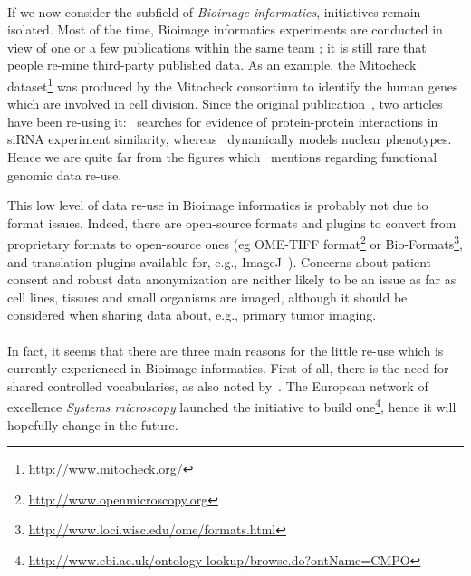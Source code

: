 \documentclass[12pt]{article}
\begin{document}
\paragraph*{}
If we now consider the subfield of \textit{Bioimage informatics}, initiatives remain isolated. Most of the time, Bioimage informatics experiments are conducted in view of one or a few publications within the same team ; it is still rare that people re-mine third-party published data. As an example, the Mitocheck dataset\footnote{\href{http://www.mitocheck.org/}{http://www.mitocheck.org/}} was produced by the Mitocheck consortium to identify the human genes which are involved in cell division. Since the original publication~\cite{pmid20360735}, two articles have been re-using it:~\cite{pmid25255318} searches for evidence of protein-protein interactions in siRNA experiment similarity, whereas~\cite{pmid24131777} dynamically models nuclear phenotypes. Hence we are quite far from the figures which~\cite{pmid24109559} mentions regarding functional genomic data re-use. 

This low level of data re-use in Bioimage informatics is probably not due to format issues. Indeed, there are open-source formats and plugins to convert from proprietary formats to open-source ones (eg OME-TIFF format\footnote{\href{http://www.openmicroscopy.org}{http://www.openmicroscopy.org}} or Bio-Formats\footnote{\href{http://www.loci.wisc.edu/ome/formats.html}{http://www.loci.wisc.edu/ome/formats.html}}, and translation plugins available for, e.g., ImageJ~\cite{imagej}). Concerns about patient consent and robust data anonymization are neither likely to be an issue as far as cell lines, tissues and small organisms are imaged, although it should be considered when sharing data about, e.g., primary tumor imaging.
\paragraph*{}
In fact, it seems that there are three main reasons for the little re-use which is currently experienced in Bioimage informatics. First of all, there is the need for shared controlled vocabularies, as also noted by~\cite{pmid18603566}. The European network of excellence \textit{Systems microscopy} launched the initiative to build one\footnote{\href{http://www.ebi.ac.uk/ontology-lookup/browse.do?ontName=CMPO}{http://www.ebi.ac.uk/ontology-lookup/browse.do?ontName=CMPO}}, hence it will hopefully change in the future.
\end{document}
